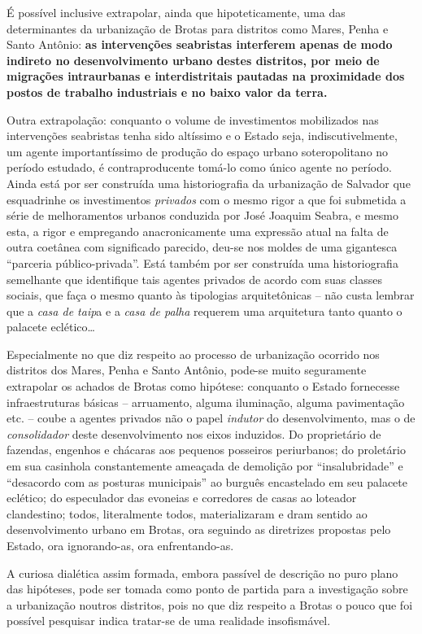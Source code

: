 É possível inclusive extrapolar, ainda que hipoteticamente, uma das determinantes da urbanização de Brotas para distritos como Mares, Penha e Santo Antônio: \textbf{as intervenções seabristas interferem apenas de modo indireto no desenvolvimento urbano destes distritos, por meio de migrações intraurbanas e interdistritais pautadas na proximidade dos postos de trabalho industriais e no baixo valor da terra.}

Outra extrapolação: conquanto o volume de investimentos mobilizados nas intervenções seabristas tenha sido altíssimo e o Estado seja, indiscutivelmente, um agente importantíssimo de produção do espaço urbano soteropolitano no período estudado, é contraproducente tomá-lo como único agente no período. Ainda está por ser construída uma historiografia da urbanização de Salvador que esquadrinhe os investimentos \textit{privados} com o mesmo rigor a que foi submetida a série de melhoramentos urbanos conduzida por José Joaquim Seabra, e mesmo esta, a rigor e empregando anacronicamente uma expressão atual na falta de outra coetânea com significado parecido, deu-se nos moldes de uma gigantesca ``parceria público-privada''. Está também por ser construída uma historiografia semelhante que identifique tais agentes privados de acordo com suas classes sociais, que faça o mesmo quanto às tipologias arquitetônicas – não custa lembrar que a \textit{casa de taip}a e a \textit{casa de palha} requerem uma arquitetura tanto quanto o palacete eclético\dots

Especialmente no que diz respeito ao processo de urbanização ocorrido nos distritos dos Mares, Penha e Santo Antônio, pode-se muito seguramente extrapolar os achados de Brotas como hipótese: conquanto o Estado fornecesse infraestruturas básicas – arruamento, alguma iluminação, alguma pavimentação etc. – coube a agentes privados não o papel \textit{indutor} do desenvolvimento, mas o de \textit{consolidador} deste desenvolvimento nos eixos induzidos. Do proprietário de fazendas, engenhos e chácaras aos pequenos posseiros periurbanos; do proletário em sua casinhola constantemente ameaçada de demolição por ``insalubridade'' e ``desacordo com as posturas municipais'' ao burguês encastelado em seu palacete eclético; do especulador das evoneias e corredores de casas ao loteador clandestino; todos, literalmente todos, materializaram e dram sentido ao desenvolvimento urbano em Brotas, ora seguindo as diretrizes propostas pelo Estado, ora ignorando-as, ora enfrentando-as.

A curiosa dialética assim formada, embora passível de descrição no puro plano das hipóteses, pode ser tomada como ponto de partida para a investigação sobre a urbanização noutros distritos, pois no que diz respeito a Brotas o pouco que foi possível pesquisar indica tratar-se de uma realidade insofismável. 

